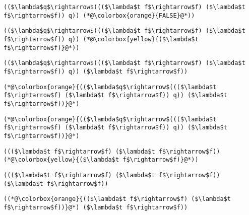 \documentclass{beamer}
\begin{document}
\begin{frame}[fragile]{\CurrentSection}
\lstset{basicstyle=\ttfamily\small}\lstset{numbers=none}\lstset{language=ML}\begin{lstlisting}
(($\lambda$q$\rightarrow$((($\lambda$t f$\rightarrow$f) ($\lambda$t f$\rightarrow$f)) q)) (*@\colorbox{orange}{FALSE}@*))
\end{lstlisting}
\pause\lstset{language=ML}\begin{lstlisting}
(($\lambda$q$\rightarrow$((($\lambda$t f$\rightarrow$f) ($\lambda$t f$\rightarrow$f)) q)) (*@\colorbox{yellow}{($\lambda$t f$\rightarrow$f)}@*))
\end{lstlisting}

\end{frame}

\begin{frame}[fragile]{\CurrentSection}
\lstset{basicstyle=\ttfamily\small}\lstset{numbers=none}\lstset{language=ML}\begin{lstlisting}
(($\lambda$q$\rightarrow$((($\lambda$t f$\rightarrow$f) ($\lambda$t f$\rightarrow$f)) q)) ($\lambda$t f$\rightarrow$f))
\end{lstlisting}
\pause\lstset{language=ML}\begin{lstlisting}
(*@\colorbox{orange}{(($\lambda$q$\rightarrow$((($\lambda$t f$\rightarrow$f) ($\lambda$t f$\rightarrow$f)) q)) ($\lambda$t f$\rightarrow$f))}@*)
\end{lstlisting}

\end{frame}

\begin{frame}[fragile]{\CurrentSection}
\lstset{basicstyle=\ttfamily\small}\lstset{numbers=none}\lstset{language=ML}\begin{lstlisting}
(*@\colorbox{orange}{(($\lambda$q$\rightarrow$((($\lambda$t f$\rightarrow$f) ($\lambda$t f$\rightarrow$f)) q)) ($\lambda$t f$\rightarrow$f))}@*)
\end{lstlisting}
\pause\lstset{language=ML}\begin{lstlisting}
((($\lambda$t f$\rightarrow$f) ($\lambda$t f$\rightarrow$f)) (*@\colorbox{yellow}{($\lambda$t f$\rightarrow$f)}@*))
\end{lstlisting}

\end{frame}

\begin{frame}[fragile]{\CurrentSection}
\lstset{basicstyle=\ttfamily\small}\lstset{numbers=none}\lstset{language=ML}\begin{lstlisting}
((($\lambda$t f$\rightarrow$f) ($\lambda$t f$\rightarrow$f)) ($\lambda$t f$\rightarrow$f))
\end{lstlisting}
\pause\lstset{language=ML}\begin{lstlisting}
((*@\colorbox{orange}{(($\lambda$t f$\rightarrow$f) ($\lambda$t f$\rightarrow$f))}@*) ($\lambda$t f$\rightarrow$f))
\end{lstlisting}

\end{frame}
\end{document}
